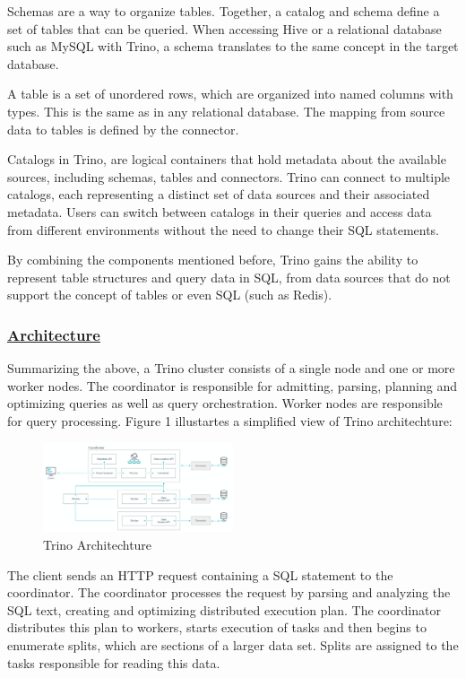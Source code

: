 \documentclass[conference]{IEEEtran}
\begin{document}
Schemas are a way to organize tables. Together, a catalog and schema define a set of tables that can be queried. When accessing Hive or a relational database such as MySQL with Trino, 
a schema translates to the same concept in the target database. 

A table is a set of unordered rows, which are organized into named columns with types. This is the same as in any relational database. The mapping from source data to tables is defined by the connector.

Catalogs in Trino, are logical containers that hold metadata about the available sources, including schemas, tables and connectors.
Trino can connect to multiple catalogs, each representing a distinct set of data sources and their associated metadata. 
Users can switch between catalogs in their queries and access data from different environments without the need to change their SQL statements.

By combining the components mentioned before, Trino gains the ability to represent table structures and query data in SQL, from data sources that do not support the concept of tables or even SQL (such as Redis).

\subsubsection{\textbf{\underline{Architecture}}}

Summarizing the above, a Trino cluster consists of a single node and one or more worker nodes. The coordinator is responsible for admitting, parsing, planning and
optimizing queries as well as query orchestration. Worker nodes are responsible for query processing. Figure 1 illustartes a simplified view of Trino architechture:
\begin{figure}[h]
    \includegraphics[width=0.5\textwidth]{images/trino-architecture.png}
    \caption{Trino Architechture}
    \label{fig:trino_architechture}
\end{figure}


The client sends an HTTP request containing a SQL statement to the coordinator. The coordinator processes the request by parsing and analyzing the SQL text, 
creating and optimizing distributed execution plan. The coordinator distributes this plan to workers, starts execution of tasks and then begins to enumerate splits,
which are sections of a larger data set. Splits are assigned to the tasks responsible for reading this data.
\end{document}
